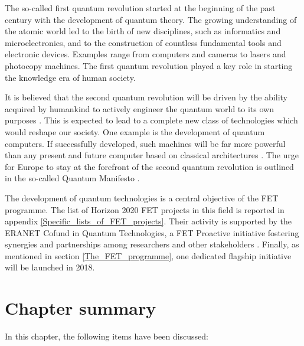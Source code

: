 The so-called first quantum revolution started at the beginning of the past century with the development of quantum theory. The growing understanding of the atomic world led to the birth of new disciplines, such as informatics and microelectronics, and to the construction of countless fundamental tools and electronic devices. Examples range from computers and cameras to lasers and photocopy machines. The first quantum revolution played a key role in starting the knowledge era of human society.

It is believed that the second quantum revolution will be driven by the ability acquired by humankind to actively engineer the quantum world to its own purposes \cite{Dowling}. This is expected to lead to a complete new class of technologies which would reshape our society. One example is the development of quantum computers. If successfully developed, such machines will be far more powerful than any present and future computer based on classical architectures \cite{Rieffel}. The urge for Europe to stay at the forefront of the second quantum revolution is outlined in the so-called Quantum Manifesto \cite{QuantumManifesto}.

The development of quantum technologies is a central objective of the FET programme.  The list of Horizon 2020 FET projects in this field is reported in appendix \ref{Specific_lists_of_FET_projects}. Their activity is supported by the ERANET Cofund in Quantum Technologies, a FET Proactive initiative fostering synergies and partnerships among researchers and other stakeholders \cite{ERANET}. Finally, as mentioned in section \ref{The_FET_programme}, one dedicated flagship initiative will be launched in 2018. 

\section{Chapter summary} 
In this chapter, the following items have been discussed:

